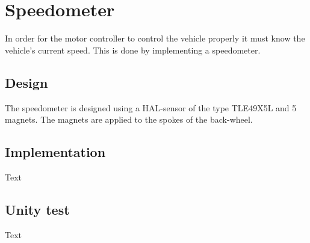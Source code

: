 \section{Speedometer}
In order for the motor controller to control the vehicle properly it must know the vehicle's current speed. This is done by implementing a speedometer.

\subsection{Design}
The speedometer is designed using a HAL-sensor of the type TLE49X5L and 5 magnets. The magnets are applied to the spokes of the back-wheel.

\subsection{Implementation}
Text

\subsection{Unity test}
Text